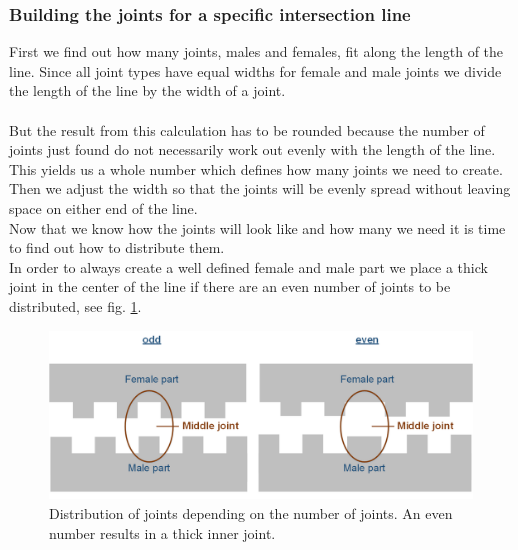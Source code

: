 \documentclass[../ClassicThesis.tex]{subfiles}
\begin{document}
\subsubsection*{Building the joints for a specific intersection line}
First we find out how many joints, males and females, fit along the length of the line.
Since all joint types have equal widths for female and male joints we divide the length of the line by the width of a joint.\\
\*\\
But the result from this calculation has to be rounded because the number of joints just found do not necessarily work out evenly with the length of the line. This yields us a whole number which defines how many joints we need to create. Then we adjust the width so that the joints will be evenly spread without leaving space on either end of the line.\\
Now that we know how the joints will look like and how many we need it is time to find out how to distribute them.\\
In order to always create a well defined female and male part we place a thick joint in the center of the line if there are an even number of joints to be distributed, see fig. \ref{fig:evenOddCount}.\\
\begin{figure}[!ht]
\centering
\includegraphics[width=\columnwidth]{Images/10-joints-evenOddJointsCount.png}
\caption{Distribution of joints depending on the number of joints. An even number results in a thick inner joint.}
\label{fig:evenOddCount}
\end{figure}
\end{document}
